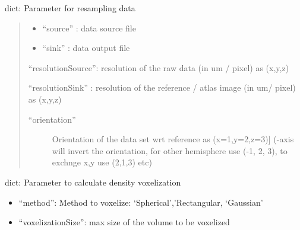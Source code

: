 \documentclass[letterpaper,10pt,english]{sphinxmanual}
\begin{document}
\begin{fulllineitems}
\label{api/ClearMap.Parameter:ClearMap.Parameter.ResamplingParameter}
dict: Parameter for resampling data
\begin{quote}
\begin{itemize}
\item {} 
``source'' : data source file

\item {} 
``sink''   : data output file

\end{itemize}

``resolutionSource'': resolution of the raw data (in um / pixel) as (x,y,z)

``resolutionSink'' : resolution of the reference / atlas image (in um/ pixel) as (x,y,z)
\begin{description}
\item[{``orientation''}] \leavevmode{[}Orientation of the data set wrt reference as (x=1,y=2,z=3){]}
(-axis will invert the orientation, for other hemisphere use (-1, 2, 3), to exchnge x,y use (2,1,3) etc)

\end{description}
\end{quote}







\end{fulllineitems}


\begin{fulllineitems}
\label{api/ClearMap.Parameter:ClearMap.Parameter.VoxelizationParameter}
dict: Parameter to calculate density voxelization
\begin{itemize}
\item {} 
``method'': Method to voxelize: `Spherical','Rectangular, `Gaussian'

\item {} 
``voxelizationSize'': max size of the volume to be voxelized

\end{itemize}







\end{fulllineitems}
\end{document}
